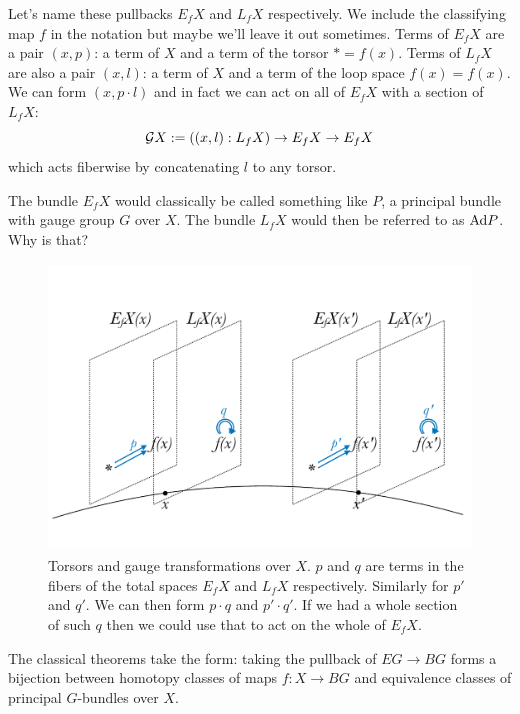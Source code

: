\documentclass[12pt]{report}
\begin{document}
Let's name these pullbacks $E_fX$ and $L_fX$ respectively. We include the classifying map $f$ in the notation but maybe we'll leave it out sometimes. Terms of $E_fX$ are a pair $(x, p)$: a term of $X$ and a term of the torsor $*=f(x)$. Terms of $L_fX$ are also a pair $(x, l)$: a term of $X$ and a term of the loop space $f(x)=f(x)$. We can form $(x, p\cdot l)$ and in fact we can act on all of $E_fX$ with a section of $L_fX$: $$\mathcal{G} X:=((x,l):L_fX)\to E_fX\to E_fX$$ which acts fiberwise by concatenating $l$ to any torsor.

The bundle $E_fX$ would classically be called something like $P$, a principal bundle with gauge group $G$ over $X$. The bundle $L_fX$ would then be referred to as $\mathrm{Ad} P$. Why is that? 

\begin{figure}[htb]
\begin{center}
\includegraphics[height=3in,width=4.5in]{torsors_and_gauge}
\caption{Torsors and gauge transformations over $X$. $p$ and $q$ are terms in the fibers of the total spaces $E_fX$ and $L_fX$ respectively. Similarly for $p'$ and $q'$. We can then form $p\cdot q$ and $p'\cdot q'$. If we had a whole section of such $q$ then we could use that to act on the whole of $E_fX$.}
\end{center}
\end{figure}

The classical theorems take the form: taking the pullback of $EG\to BG$ forms a bijection between homotopy classes of maps $f:X\to BG$ and equivalence classes of principal $G$-bundles over $X$. 

\end{document}
